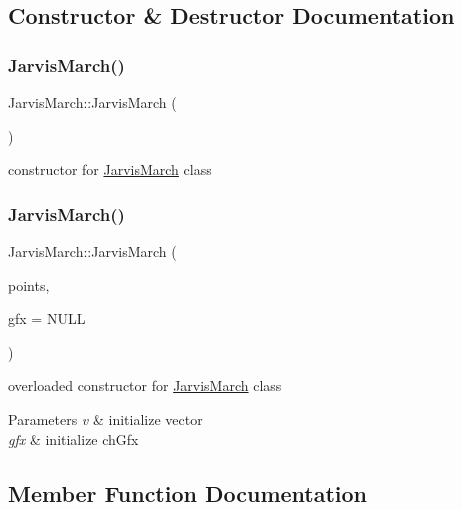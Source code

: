 \subsection{Constructor \& Destructor Documentation}
\mbox{\label{class_jarvis_march_a077887259741d7c57e1f64ea9ce7b324}} 
\subsubsection{\texorpdfstring{JarvisMarch()}{JarvisMarch()}\hspace{0.1cm}{\footnotesize\ttfamily [1/2]}}
{\footnotesize\ttfamily Jarvis\+March\+::\+Jarvis\+March (\begin{DoxyParamCaption}{ }\end{DoxyParamCaption})}

constructor for \mbox{\hyperlink{class_jarvis_march}{Jarvis\+March}} class \mbox{\label{class_jarvis_march_a0f28b67cdc8868e9ccb84bbcc3ef340f}} 
\subsubsection{\texorpdfstring{JarvisMarch()}{JarvisMarch()}\hspace{0.1cm}{\footnotesize\ttfamily [2/2]}}
{\footnotesize\ttfamily Jarvis\+March\+::\+Jarvis\+March (\begin{DoxyParamCaption}\item[{std\+::vector$<$ \mbox{\hyperlink{class_point}{Point}} $>$ \&}]{points,  }\item[{\mbox{\hyperlink{class_convex_hull_graphix}{Convex\+Hull\+Graphix}} $\ast$}]{gfx = {\ttfamily NULL} }\end{DoxyParamCaption})}

overloaded constructor for \mbox{\hyperlink{class_jarvis_march}{Jarvis\+March}} class 
\begin{DoxyParams}{Parameters}
{\em v} & initialize vector \\
\hline
{\em gfx} & initialize ch\+Gfx \\
\hline
\end{DoxyParams}


\subsection{Member Function Documentation}
\mbox{\label{class_jarvis_march_a5617c3acf6ab1f5ad7988e0c856740c3}} 
